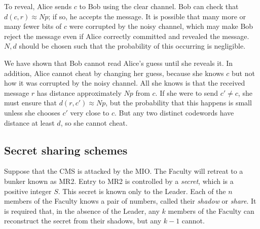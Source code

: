 To reveal, Alice sends \( c \) to Bob using the clear channel.
Bob can check that \( d(c,r) \approx Np \); if so, he accepts the message.
It is possible that many more or many fewer bits of \( c \) were corrupted by the noisy channel, which may make Bob reject the message even if Alice correctly committed and revealed the message.
\( N, d \) should be chosen such that the probability of this occurring is negligible.

We have shown that Bob cannot read Alice's guess until she reveals it.
In addition, Alice cannot cheat by changing her guess, because she knows \( c \) but not how it was corrupted by the noisy channel.
All she knows is that the received message \( r \) has distance approximately \( Np \) from \( c \).
If she were to send \( c' \neq c \), she must ensure that \( d(r,c') \approx Np \), but the probability that this happens is small unless she chooses \( c' \) very close to \( c \).
But any two distinct codewords have distance at least \( d \), so she cannot cheat.

\subsection{Secret sharing schemes}
Suppose that the CMS is attacked by the MIO.
The Faculty will retreat to a bunker known as MR2.
Entry to MR2 is controlled by a \emph{secret}, which is a positive integer \( S \).
This secret is known only to the Leader.
Each of the \( n \) members of the Faculty knows a pair of numbers, called their \emph{shadow} or \emph{share}.
It is required that, in the absence of the Leader, any \( k \) members of the Faculty can reconstruct the secret from their shadows, but any \( k-1 \) cannot.

